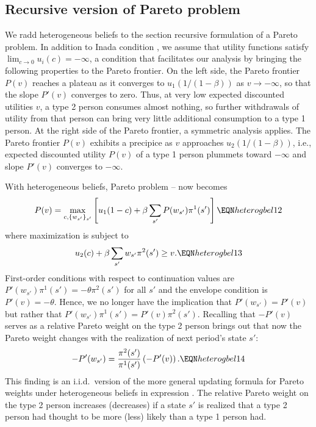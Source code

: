 \subsection{Recursive version of Pareto problem}
 We radd heterogeneous beliefs to the section  recursive  formulation of a
Pareto problem.
In addition to Inada condition , we 
assume that utility functions satisfy 
$\lim_{c \rightarrow 0} u_i(c) = -\infty$, a condition that facilitates 
 our analysis by bringing the following 
properties to  the Pareto frontier. On the left 
side, the Pareto frontier $P(v)$ reaches a plateau 
as it converges to $u_1(1/(1-\beta))$ as 
$v \rightarrow -\infty$, so that the  slope $P'(v)$
converges to zero. Thus, at very  low 
expected discounted utilities $v$, a type 2 person
consumes almost nothing, so further withdrawals of utility from that person can bring 
 very little additional consumption  to
a type 1 person. %
At  
the right side of the Pareto frontier, a symmetric analysis  applies. The Pareto
frontier $P(v)$ exhibits a precipice as $v$ 
approaches $u_2(1/(1-\beta))$, i.e.,  expected
discounted utility $P(v)$ of a type 1 person
plummets toward $-\infty$ and  slope $P'(v)$
converges to $-\infty$.

With heterogeneous beliefs,
Pareto problem --
now becomes
$$ P(v) = \max_{c, \{w_{s'} \}_{s'} } \left[ u_1(1-c) 
   + \beta \sum_{s'} P(w_{s'}) \pi^1(s') \right] 
                                      \EQN heterogbel12 $$
where  maximization is subject to
$$ u_2(c) + \beta \sum_{s'} w_{s'} \pi^2(s') \geq v .
                                      \EQN heterogbel13 $$
First-order conditions with respect to continuation
values are $P'(w_{s'}) \pi^1(s') =- \theta \pi^2(s')$  
for all $s'$ and the envelope condition is 
$P'(v) = -\theta$. Hence, we no longer have the
implication that $P'(w_{s'})=P'(v)$ but rather that
$P'(w_{s'}) \pi^1(s') =P'(v) \pi^2(s')$.
Recalling  that $-P'(v)$ serves as a relative Pareto weight
on the type 2 person 
brings out that now the Pareto weight changes with
the realization of next period's state $s'$:
$$
-P'(w_{s'})= {\frac{\pi^2(s')}{\pi^1(s')}} 
              \left(-P'(v)\right) .     \EQN heterogbel14 $$
This finding is an i.i.d.\ version of the more general updating formula for  Pareto weights under heterogeneous 
beliefs in expression . 
The relative Pareto weight on the 
type 2 person increases (decreases) if a state $s'$
is realized that a type 2 person had thought
to be more (less) likely  than a type 1 person had. 


